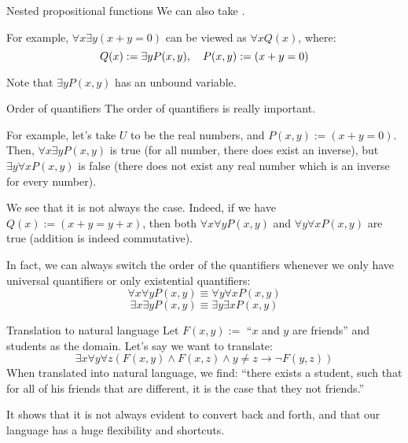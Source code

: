 \documentclass{article}
\begin{document}
\begin{parag}{Nested propositional functions}
    We can also take .

    For example, $\forall x \exists y \left(x + y = 0\right)$ can be viewed as $\forall x Q\left(x\right)$, where: 
    \[Q\left(x\right) := \exists y P\left(x, y\right), \mathspace P\left(x, y\right) := \left(x + y = 0\right)\]
    
    Note that $\exists y P\left(x, y\right)$ has an unbound variable.
\end{parag}

\begin{parag}{Order of quantifiers}
    The order of quantifiers is really important. 

    For example, let's take $U$ to be the real numbers, and $P\left(x, y\right) := \left(x + y = 0\right)$. Then, $\forall x \exists y P\left(x, y\right)$ is true (for all number, there does exist an inverse), but $\exists y \forall x P\left(x, y\right)$ is false (there does not exist any real number which is an inverse for every number).

    We see that it is not always the case. Indeed, if we have $Q\left(x\right) := \left(x + y = y + x\right)$, then both $\forall x \forall y P\left(x, y\right)$ and $\forall y \forall x P\left(x, y\right)$ are true (addition is indeed commutative).

    In fact, we can always switch the order of the quantifiers whenever we only have universal quantifiers or only existential quantifiers: 
    \[\forall x \forall y P\left(x, y\right) \equiv \forall y \forall x P\left(x, y\right)\]
    \[\exists x \exists y P\left(x, y\right) \equiv \exists y \exists x P\left(x, y\right)\]
\end{parag}

\begin{parag}{Translation to natural language}
    Let $F\left(x, y\right) := $ ``$x$ and $y$ are friends'' and students as the domain. Let's say we want to translate: 
    \[\exists x \forall y \forall z\left(F\left(x, y\right) \land F\left(x, z\right) \land y \neq z \to \lnot F\left(y, z\right)\right)\]
    When translated into natural language, we find: ``there exists a student, such that for all of his friends that are different, it is the case that they not friends.''

    It shows that it is not always evident to convert back and forth, and that our language has a huge flexibility and shortcuts.
\end{parag}
\end{document}
